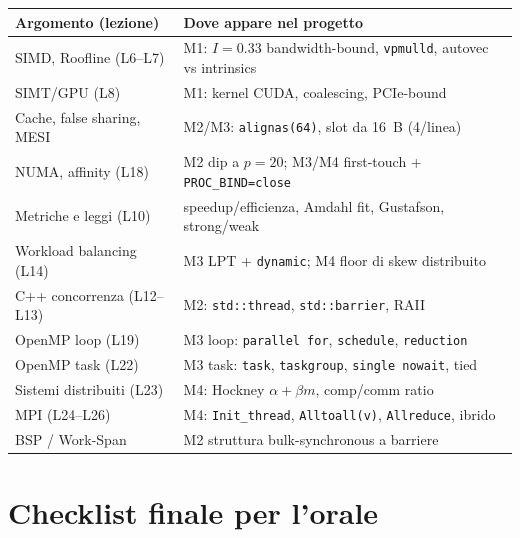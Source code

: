\documentclass[11pt,a4paper]{article}
\begin{document}
\begin{table}[H]
\centering\small
\begin{tabularx}{\textwidth}{@{}lX@{}}
\toprule
\textbf{Argomento (lezione)} & \textbf{Dove appare nel progetto} \\
\midrule
SIMD, Roofline (L6--L7) & M1: $I{=}0.33$ bandwidth-bound, \texttt{vpmulld}, autovec vs intrinsics \\
SIMT/GPU (L8) & M1: kernel CUDA, coalescing, PCIe-bound \\
Cache, false sharing, MESI & M2/M3: \texttt{alignas(64)}, slot da 16~B (4/linea) \\
NUMA, affinity (L18) & M2 dip a $p{=}20$; M3/M4 first-touch + \texttt{PROC\_BIND=close} \\
Metriche e leggi (L10) & speedup/efficienza, Amdahl fit, Gustafson, strong/weak \\
Workload balancing (L14) & M3 LPT + \texttt{dynamic}; M4 floor di skew distribuito \\
C++ concorrenza (L12--L13) & M2: \texttt{std::thread}, \texttt{std::barrier}, RAII \\
OpenMP loop (L19) & M3 loop: \texttt{parallel for}, \texttt{schedule}, \texttt{reduction} \\
OpenMP task (L22) & M3 task: \texttt{task}, \texttt{taskgroup}, \texttt{single nowait}, tied \\
Sistemi distribuiti (L23) & M4: Hockney $\alpha{+}\beta m$, comp/comm ratio \\
MPI (L24--L26) & M4: \texttt{Init\_thread}, \texttt{Alltoall(v)}, \texttt{Allreduce}, ibrido \\
BSP / Work-Span & M2 struttura bulk-synchronous a barriere \\
\bottomrule
\end{tabularx}
\end{table}

\section{Checklist finale per l'orale}
\end{document}
